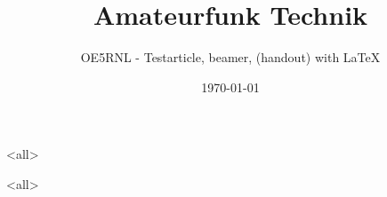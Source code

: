 \usepackage[utf8]{inputenc}
\usepackage[T1]{fontenc}
\usepackage{lmodern}
\usepackage[ngerman]{babel}
\usepackage{graphicx}\graphicspath{{grafik/}}
\usepackage{blindtext}

\usepackage{color}
\usepackage{transparent}
\usepackage{tikz}

\usetikzlibrary{arrows}
\usepackage{wrapfig}

\title{Amateurfunk Technik}
\author{OE5RNL - Testarticle, beamer, (handout) with \LaTeX}
\date{\today}



    \mode<all>
    
    \begin{frame}
        \maketitle
    \end{frame}
    
    \mode<all>{
        
        
        
        
    }

